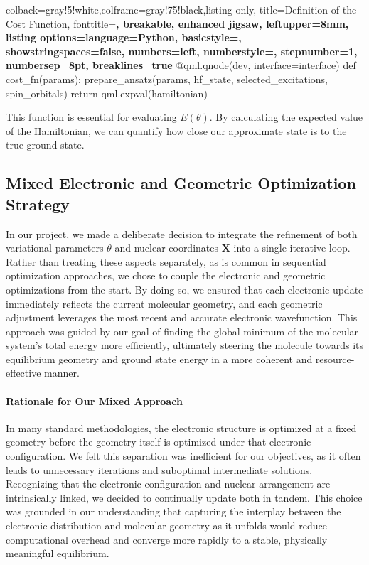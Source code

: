   \begin{tcblisting}{colback=gray!5!white,colframe=gray!75!black,listing only,
    title=Definition of the Cost Function, fonttitle=\bfseries, breakable, enhanced jigsaw, leftupper=8mm,
    listing options={language=Python, basicstyle=\ttfamily\small,
    showstringspaces=false, numbers=left, numberstyle=\footnotesize, stepnumber=1, numbersep=8pt, breaklines=true}}
@qml.qnode(dev, interface=interface)
def cost_fn(params):
    prepare_ansatz(params, hf_state, selected_excitations, spin_orbitals)
    return qml.expval(hamiltonian)
  \end{tcblisting}
  
This function is essential for evaluating \(E(\theta)\). By calculating the expected value of the Hamiltonian, we can quantify how close our approximate state is to the true ground state.

\subsection{Mixed Electronic and Geometric Optimization Strategy}

In our project, we made a deliberate decision to integrate the refinement of both variational parameters \(\theta\) and nuclear coordinates \(\mathbf{X}\) into a single iterative loop. Rather than treating these aspects separately, as is common in sequential optimization approaches, we chose to couple the electronic and geometric optimizations from the start. By doing so, we ensured that each electronic update immediately reflects the current molecular geometry, and each geometric adjustment leverages the most recent and accurate electronic wavefunction. This approach was guided by our goal of finding the global minimum of the molecular system’s total energy more efficiently, ultimately steering the molecule towards its equilibrium geometry and ground state energy in a more coherent and resource-effective manner.

\paragraph{Rationale for Our Mixed Approach}
In many standard methodologies, the electronic structure is optimized at a fixed geometry before the geometry itself is optimized under that electronic configuration. We felt this separation was inefficient for our objectives, as it often leads to unnecessary iterations and suboptimal intermediate solutions. Recognizing that the electronic configuration and nuclear arrangement are intrinsically linked, we decided to continually update both in tandem. This choice was grounded in our understanding that capturing the interplay between the electronic distribution and molecular geometry as it unfolds would reduce computational overhead and converge more rapidly to a stable, physically meaningful equilibrium.

